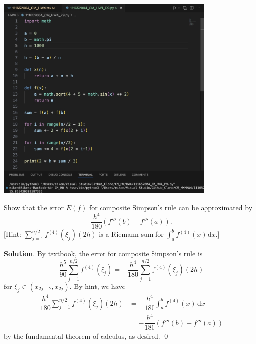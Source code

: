 \documentclass[11pt]{article}
\theoremstyle{break}
\newcommand{\ddi}{\text{$\,$d}}
\numberwithin{equation}{theorem}
\begin{document}
\begin{center}
    \includegraphics[width=0.8\textwidth]{P9.jpg}
\end{center}


\newpage
\begin{problem}\label{problem 10} %
    Show that the error $E(f)$ for composite Simpson's rule can be approximated by $$-\dfrac{h^4}{180}\left(f'''(b)-f'''(a)\right).$$ [Hint: $\displaystyle\sum_{j=1}^{n/2}f^{(4)}(\xi_j)(2h)$ is a Riemann sum for $\displaystyle\int_{a}^{b}f^{(4)}(x)\ddi x$.]
\end{problem}
\textbf{Solution}. By textbook, the error for composite Simpson's rule is $$-\dfrac{h^5}{90}\sum_{j=1}^{n/2}f^{(4)}(\xi_j)=-\dfrac{h^4}{180}\sum_{j=1}^{n/2}f^{(4)}(\xi_j)(2h)$$ for $\xi_j\in(x_{2j-2}, x_{2j})$. By hint, we have \begin{align*}
    -\dfrac{h^4}{180}\sum_{j=1}^{n/2}f^{(4)}(\xi_j)(2h)&=-\dfrac{h^4}{180}\int_{a}^{b}f^{(4)}(x)\ddi x\\
    &=-\dfrac{h^4}{180}\left(f'''(b)-f'''(a)\right)
\end{align*}
by the fundamental theorem of calculus, as desired. \qed
\end{document}

